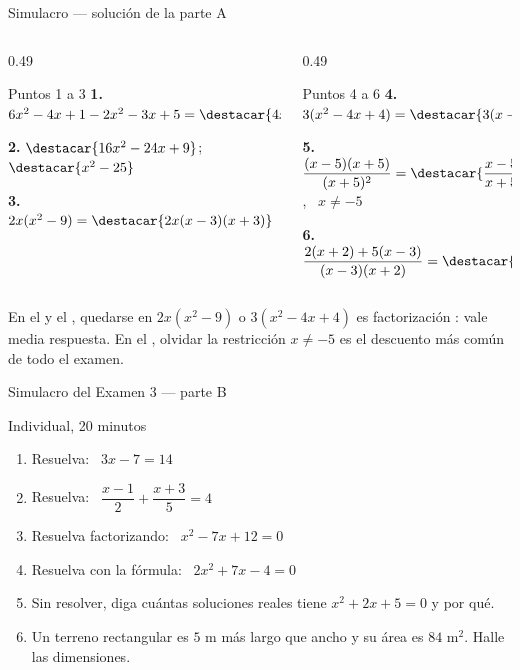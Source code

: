 \documentclass[aspectratio=169,10pt]{beamer}
\begin{document}
\begin{frame}{Simulacro — solución de la parte A}
  \scriptsize
  \begin{columns}[T,onlytextwidth]
    \begin{column}{0.49\textwidth}
      \begin{block}{Puntos 1 a 3}
        \tiny
        \textbf{1.} $6x^{2}-4x+1-2x^{2}-3x+5
        = \destacar{4x^{2}-7x+6}$

        \vspace{0.1cm}
        \textbf{2.} $\destacar{16x^{2}-24x+9}$; \
        $\destacar{x^{2}-25}$

        \vspace{0.1cm}
        \textbf{3.} $2x(x^{2}-9)
        = \destacar{2x(x-3)(x+3)}$
      \end{block}
    \end{column}
    \begin{column}{0.49\textwidth}
      \begin{block}{Puntos 4 a 6}
        \tiny
        \textbf{4.} $3(x^{2}-4x+4)
        = \destacar{3(x-2)^{2}}$

        \vspace{0.1cm}
        \textbf{5.} $\dfrac{(x-5)(x+5)}{(x+5)^{2}}
        = \destacar{\dfrac{x-5}{x+5}}$, \ $x\neq -5$

        \vspace{0.1cm}
        \textbf{6.} $\dfrac{2(x+2)+5(x-3)}{(x-3)(x+2)}
        = \destacar{\dfrac{7x-11}{x^{2}-x-6}}$
      \end{block}
    \end{column}
  \end{columns}

  \vspace{0.08cm}
  {\tiny\color{uniGris} En el  y el , quedarse en
  $2x(x^{2}-9)$ o $3(x^{2}-4x+4)$ es factorización \azul{incompleta}: vale
  media respuesta. En el \destacar{5}, olvidar la restricción $x\neq -5$ es el
  descuento más común de todo el examen.}
\end{frame}

\begin{frame}{Simulacro del Examen 3 — parte B}
  \begin{alertblock}{Individual, 20 minutos}
    \scriptsize
    \begin{enumerate}\setlength{\itemsep}{0.0cm}
      \setcounter{enumi}{6}
      \item Resuelva: \ $3x-7 = 14$
      \item Resuelva: \ $\dfrac{x-1}{2}+\dfrac{x+3}{5} = 4$
      \item Resuelva factorizando: \ $x^{2}-7x+12 = 0$
      \item Resuelva con la fórmula: \ $2x^{2}+7x-4 = 0$
      \item Sin resolver, diga cuántas soluciones reales tiene
            $x^{2}+2x+5=0$ y por qué.
      \item Un terreno rectangular es $5$ m más largo que ancho y su área es
            $84$ m$^{2}$. Halle las dimensiones.
    \end{enumerate}
  \end{alertblock}
\end{frame}
\end{document}
